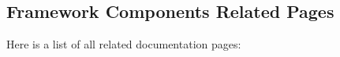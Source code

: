 \subsection{Framework Components Related Pages}
Here is a list of all related documentation pages:\begin{CompactList}
\item {}

\end{CompactList}
